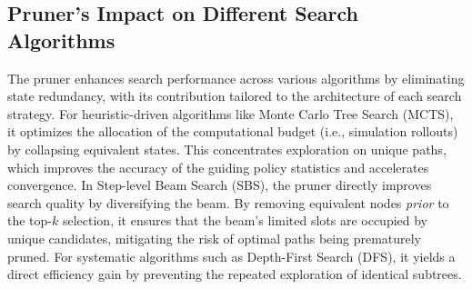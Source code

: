 \documentclass[11pt]{article}
\begin{document}
\subsection{Pruner's Impact on Different Search Algorithms}
The pruner enhances search performance across various algorithms by eliminating state redundancy, with its contribution tailored to the architecture of each search strategy. For heuristic-driven algorithms like Monte Carlo Tree Search (MCTS), it optimizes the allocation of the computational budget (i.e., simulation rollouts) by collapsing equivalent states. This concentrates exploration on unique paths, which improves the accuracy of the guiding policy statistics and accelerates convergence. In Step-level Beam Search (SBS), the pruner directly improves search quality by diversifying the beam. By removing equivalent nodes \textit{prior} to the top-$k$ selection, it ensures that the beam's limited slots are occupied by unique candidates, mitigating the risk of optimal paths being prematurely pruned. For systematic algorithms such as Depth-First Search (DFS), it yields a direct efficiency gain by preventing the repeated exploration of identical subtrees.
\end{document}
